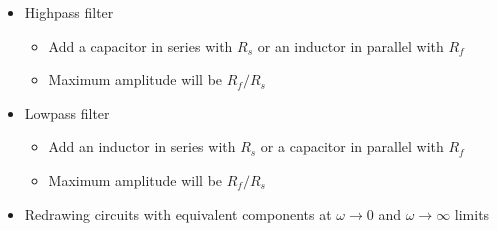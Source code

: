 \begin{itemize}
\item Highpass filter
  \begin{itemize}
  \item Add a capacitor in series with $R_s$ or an inductor in parallel with $R_f$
  \item Maximum amplitude will be $R_f/R_s$
  \end{itemize}
\item Lowpass filter
  \begin{itemize}
  \item Add an inductor in series with $R_s$ or a capacitor in parallel with $R_f$
  \item Maximum amplitude will be $R_f/R_s$
  \end{itemize}
\item Redrawing circuits with equivalent components at $\omega \rightarrow 0$ and $\omega \rightarrow \infty$ limits
\end{itemize}
